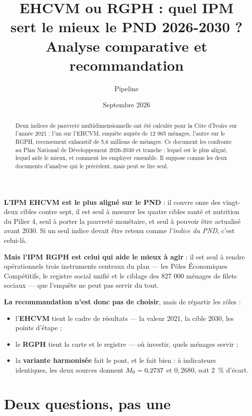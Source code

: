 \documentclass[11pt,a4paper]{article}
\title{\bfseries EHCVM ou RGPH : quel IPM sert le mieux le PND 2026-2030 ?\\[4pt]
\large Analyse comparative et recommandation}
\author{Pipeline \col{PythonIPM}}
\date{Septembre 2026}
\begin{document}
\maketitle

\begin{abstract}
\noindent Deux indices de pauvreté multidimensionnelle ont été calculés pour la Côte d'Ivoire sur
l'année 2021 : l'un sur l'EHCVM, enquête auprès de 12 965 ménages, l'autre sur le RGPH, recensement
exhaustif de 5,6 millions de ménages. Ce document les confronte au Plan National de Développement
2026-2030 et tranche : lequel est le plus aligné, lequel aide le mieux, et comment les employer
ensemble. Il suppose connus les deux documents d'analyse qui le précèdent, mais peut se lire seul.
\end{abstract}

\begin{retenir}
\textbf{L'IPM EHCVM est le plus aligné sur le PND} : il couvre onze des vingt-deux cibles contre
sept, il est seul à mesurer les quatre cibles santé et nutrition du Pilier 4, seul à porter la
pauvreté monétaire, et seul à pouvoir être actualisé avant 2030. Si un seul indice devait être
retenu comme \emph{l'indice du PND}, c'est celui-là.

\textbf{Mais l'IPM RGPH est celui qui aide le mieux à agir} : il est seul à rendre opérationnels
trois instruments centraux du plan --- les Pôles Économiques Compétitifs, le registre social unifié
et le ciblage des 827 000 ménages de filets sociaux --- que l'enquête ne peut pas servir du tout.

\textbf{La recommandation n'est donc pas de choisir}, mais de répartir les rôles :
\begin{itemize}
  \item l'\textbf{EHCVM} tient le cadre de résultats --- la valeur 2021, la cible 2030, les points
        d'étape ;
  \item le \textbf{RGPH} tient la carte et le registre --- où investir, quels ménages servir ;
  \item la \textbf{variante harmonisée} fait le pont, et le fait bien : à indicateurs identiques,
        les deux sources donnent $M_{0} = 0{,}2737$ et $0{,}2680$, soit 2~\% d'écart.
\end{itemize}
\end{retenir}

\tableofcontents
\bigskip

\section{Deux questions, pas une}
\end{document}
